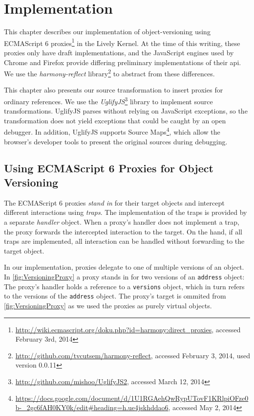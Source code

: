 \section{Implementation} \label{chapter:IMPLEMENTATION}

This chapter describes our implementation of object-versioning using ECMAScript 6 proxies\footnote{\url{http://wiki.ecmascript.org/doku.php?id=harmony:direct_proxies}, accessed February 3rd, 2014} in the Lively Kernel.
At the time of this writing, these proxies only have draft implementations, and the JavaScript engines used by Chrome and Firefox provide differing preliminary implementations of their \ac{api}.
We use the \emph{harmony-reflect} library\footnote{\url{http://github.com/tvcutsem/harmony-reflect}, accessed February 3, 2014, used version 0.0.11} to abstract from these differences.

This chapter also presents our source transformation to insert proxies for ordinary references.
We use the \emph{UglifyJS}\footnote{\url{http://github.com/mishoo/UglifyJS2}, accessed March 12, 2014} library to implement source transformations.
UglifyJS parses without relying on JavaScript exceptions, so the transformation does not yield exceptions that could be caught by an open debugger.
In addition, UglifyJS supports Source Maps\footnote{\url{https://docs.google.com/document/d/1U1RGAehQwRypUTovF1KRlpiOFze0b-_2gc6fAH0KY0k/edit\#heading=h.ue4jskhddao6}, accessed May 2, 2014}, which allow the browser's developer tools to present the original sources during debugging.

\subsection{Using ECMAScript 6 Proxies for Object Versioning} \label{subsec:IMPLEMENTATION:1.2}

The ECMAScript 6 proxies \emph{stand in} for their target objects and intercept different interactions using \emph{traps}.
The implementation of the traps is provided by a separate \emph{handler} object.
When a proxy's handler does not implement a trap, the proxy forwards the intercepted interaction to the target.
On the hand, if all traps are implemented, all interaction can be handled without forwarding to the target object.

In our implementation, proxies delegate to one of multiple versions of an object.
In \autoref{fig:VersioningProxy} a proxy stands in for two versions of an \lstinline{address} object: The proxy's handler holds a reference to a \lstinline{versions} object, which in turn refers to the versions of the \lstinline{address} object.
The proxy's target is ommited from \autoref{fig:VersioningProxy} as we used the proxies as purely virtual objects.

